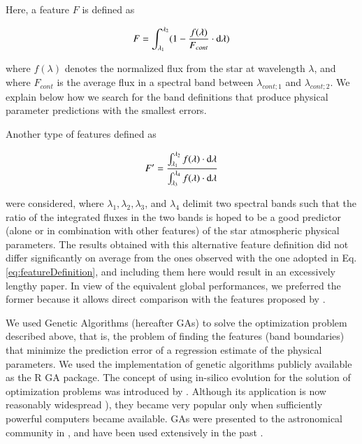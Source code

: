 Here, a feature $F$ is defined as

\begin{equation}\label{eq:featureDefinition}
  F = \int_{\lambda_{1}}^{\lambda_{2}} (1-\frac{f(\lambda)}{F_{cont}} \cdot {\rm d}{\lambda})
\label{eq:featuredef}
\end{equation}

where $f(\lambda)$ denotes the normalized flux from the star at
wavelength $\lambda$, and where $F_{cont}$ is the average flux in a
spectral band between $\lambda_{cont;1}$ and $\lambda_{cont;2}$. We
explain below how we search for the band definitions that produce
physical parameter predictions with the smallest errors.

Another type of features defined as

\begin{equation}\label{eq:feature2}
  F' = \frac{ \int_{\lambda_{1}}^{\lambda_{2}}f(\lambda) \cdot {\rm d}{\lambda}}
               {\int_{\lambda_{3}}^{\lambda_{4}} f(\lambda) \cdot {\rm d}{\lambda}} 
\end{equation}

were considered, where $\lambda_1, \lambda_2, \lambda_3$, and
$\lambda_4$ delimit two spectral bands such that the ratio of the
integrated fluxes in the two bands is hoped to be a good predictor
(alone or in combination with other features) of the star atmospheric
physical parameters. The results obtained with this alternative
feature definition did not differ significantly on average from the
ones observed with the one adopted in Eq. \ref{eq:featureDefinition},
and including them here would result in an excessively lengthy
paper. In view of the equivalent global performances, we preferred the
former because it allows direct comparison with the features proposed
by \cite{cesetti}.

We used Genetic Algorithms (hereafter GAs) to solve the optimization
problem described above, that is, the problem of finding the features
(band boundaries) that minimize the prediction error of a regression
estimate of the physical parameters. We used the implementation of
genetic algorithms publicly available as the R \citep{R2013} GA
package. The concept of using in-silico evolution for the solution of
optimization problems was introduced
by \cite{holland1975adaptation}. Although its application is now
reasonably widespread \citep[see e.g. ]{goldberg1989genetic}), they
became very popular only when sufficiently powerful computers became
available. GAs were presented to the astronomical community
in \cite{1995ApJS..101..309C}, and have been used extensively in the
past \citep[see][for the last application of GAs in astronomy at the
time of writing]{}.


